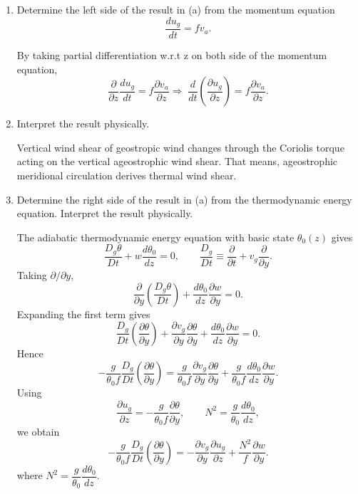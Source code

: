 \documentclass[11pt,a4paper]{article}
\begin{document}
{\begin{enumerate}[label=(\alph*)]
    \item Determine the left side of the result in (a) from the momentum equation
    \[
        \frac{du_g}{dt} = f v_a.
    \]

\begin{solution}
    By taking partial differentiation w.r.t z on both side of the momentum equation, 
    $$\frac{\partial}{\partial z}\frac{du_g}{dt}
        = f\frac{\partial v_a}{\partial z} \Rightarrow\; \frac{d}{dt} \left(\frac{\partial u_g}{\partial z}\right) 
    = f\frac{\partial v_a}{\partial z}.$$
\end{solution}
    
    \item Interpret the result physically.
\begin{solution}
    Vertical wind shear of geostropic wind changes through the Coriolis torque acting on the vertical ageostrophic wind shear. That means, ageostrophic meridional circulation derives thermal wind shear. 
\end{solution}
    
\item Determine the right side of the result in (a) from the thermodynamic energy equation. Interpret the result physically.
\begin{solution}
    The adiabatic thermodynamic energy equation with basic state $\theta_0(z)$ gives
\[
\frac{D_g\theta}{Dt}+w\frac{d\theta_0}{dz}=0,
\qquad
\frac{D_g}{Dt}\equiv \frac{\partial}{\partial t}+v_g\frac{\partial}{\partial y}.
\]
Taking $\partial/\partial y$,
\[
\frac{\partial}{\partial y}\!\left(\frac{D_g\theta}{Dt}\right)
+\frac{d\theta_0}{dz}\frac{\partial w}{\partial y}=0.
\]
Expanding the first term gives
\[
\frac{D_g}{Dt}\!\left(\frac{\partial\theta}{\partial y}\right)
+\frac{\partial v_g}{\partial y}\frac{\partial\theta}{\partial y}
+\frac{d\theta_0}{dz}\frac{\partial w}{\partial y}=0.
\]
Hence
\[
-\frac{g}{\theta_0 f}\frac{D_g}{Dt}\!\left(\frac{\partial\theta}{\partial y}\right)
=
\frac{g}{\theta_0 f}\frac{\partial v_g}{\partial y}\frac{\partial\theta}{\partial y}
+\frac{g}{\theta_0 f}\frac{d\theta_0}{dz}\frac{\partial w}{\partial y}.
\]
Using
\[
\frac{\partial u_g}{\partial z}
=
-\frac{g}{\theta_0 f}\frac{\partial\theta}{\partial y},
\qquad
N^2=\frac{g}{\theta_0}\frac{d\theta_0}{dz},
\]
we obtain
\[
-\frac{g}{\theta_0 f}\frac{D_g}{Dt}\!\left(\frac{\partial\theta}{\partial y}\right)
=
-\frac{\partial v_g}{\partial y}\frac{\partial u_g}{\partial z}
+\frac{N^2}{f}\frac{\partial w}{\partial y}.
\]
    where $N^2 = \dfrac{g}{\theta_0}\dfrac{d\theta_0}{dz}$.


\end{solution}
\end{enumerate}}
\end{document}
